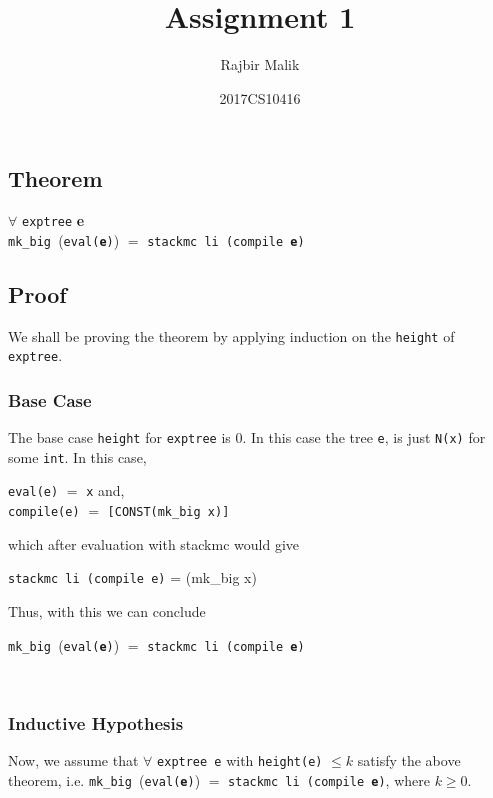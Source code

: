 \documentclass{article}
\title{Assignment 1}
\author{Rajbir Malik}
\date{2017CS10416}
\begin{document}
\maketitle
\subsection*{Theorem}

\begin{center}
\(\forall\) \texttt{exptree} \textbf{e} \\ \texttt{mk\_big }(\texttt{eval(\textbf{e})}) \(=\) \texttt{stackmc li (compile \textbf{e})} \\
\end{center}

\subsection*{Proof}
We shall be proving the theorem by applying induction on the \texttt{height} of \texttt{exptree}. \\
\subsubsection*{Base Case}
The base case \texttt{height} for \texttt{exptree} is 0. In this case the tree \texttt{e}, is just \texttt{N(x)} for some \texttt{int}.
In this case,
\begin{center}
    \texttt{eval(e)} \(=\) \texttt{x} and,\\
    \texttt{compile(e)} \(=\) \texttt{[CONST(mk\_big x)]} \\
\end{center}
    which after evaluation with stackmc would give
\begin{center}
    \texttt{stackmc li (compile e)} = (mk\_big x)
\end{center}
Thus, with this we can conclude
\begin{center}
    \texttt{mk\_big }(\texttt{eval(\textbf{e})}) \(=\) \texttt{stackmc li (compile \textbf{e})}
\end{center}
\phantom \\
\subsubsection*{Inductive Hypothesis}
Now, we assume that \( \forall \) \texttt{exptree e} with \texttt{height(e)} \(\leq k\) satisfy the above theorem, i.e. \texttt{mk\_big }(\texttt{eval(\textbf{e})}) \(=\) \texttt{stackmc li (compile \textbf{e})}, where \( k \geq 0\). \\[10 pt]
\end{document}
